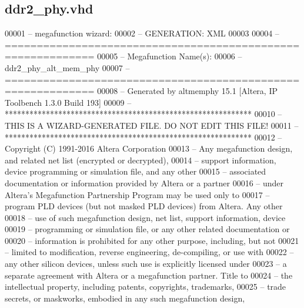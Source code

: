 \subsection{ddr2\+\_\+phy.\+vhd}
\label{ddr2__phy_8vhd_source}

\begin{DoxyCode}
00001 \textcolor{keyword}{-- megafunction wizard: %
00002 \textcolor{keyword}{-- GENERATION: XML}
00003 
00004 \textcolor{keyword}{-- ============================================================}
00005 \textcolor{keyword}{-- Megafunction Name(s):}
00006 \textcolor{keyword}{--          ddr2\_phy\_alt\_mem\_phy}
00007 \textcolor{keyword}{-- ============================================================}
00008 \textcolor{keyword}{-- Generated by altmemphy 15.1 [Altera, IP Toolbench 1.3.0 Build 193]}
00009 \textcolor{keyword}{-- ************************************************************}
00010 \textcolor{keyword}{-- THIS IS A WIZARD-GENERATED FILE. DO NOT EDIT THIS FILE!}
00011 \textcolor{keyword}{-- ************************************************************}
00012 \textcolor{keyword}{-- Copyright (C) 1991-2016 Altera Corporation}
00013 \textcolor{keyword}{-- Any megafunction design, and related net list (encrypted or decrypted),}
00014 \textcolor{keyword}{-- support information, device programming or simulation file, and any other}
00015 \textcolor{keyword}{-- associated documentation or information provided by Altera or a partner}
00016 \textcolor{keyword}{-- under Altera's Megafunction Partnership Program may be used only to}
00017 \textcolor{keyword}{-- program PLD devices (but not masked PLD devices) from Altera.  Any other}
00018 \textcolor{keyword}{-- use of such megafunction design, net list, support information, device}
00019 \textcolor{keyword}{-- programming or simulation file, or any other related documentation or}
00020 \textcolor{keyword}{-- information is prohibited for any other purpose, including, but not}
00021 \textcolor{keyword}{-- limited to modification, reverse engineering, de-compiling, or use with}
00022 \textcolor{keyword}{-- any other silicon devices, unless such use is explicitly licensed under}
00023 \textcolor{keyword}{-- a separate agreement with Altera or a megafunction partner.  Title to}
00024 \textcolor{keyword}{-- the intellectual property, including patents, copyrights, trademarks,}
00025 \textcolor{keyword}{-- trade secrets, or maskworks, embodied in any such megafunction design,}
}
\end{DoxyCode}
